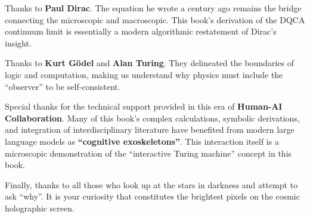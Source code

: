Thanks to \textbf{Paul Dirac}. The equation he wrote a century ago remains the bridge connecting the microscopic and macroscopic. This book's derivation of the DQCA continuum limit is essentially a modern algorithmic restatement of Dirac's insight.

Thanks to \textbf{Kurt G\"{o}del} and \textbf{Alan Turing}. They delineated the boundaries of logic and computation, making us understand why physics must include the ``observer'' to be self-consistent.

Special thanks for the technical support provided in this era of \textbf{Human-AI Collaboration}. Many of this book's complex calculations, symbolic derivations, and integration of interdisciplinary literature have benefited from modern large language models as \textbf{``cognitive exoskeletons''}. This interaction itself is a microscopic demonstration of the ``interactive Turing machine'' concept in this book.

Finally, thanks to all those who look up at the stars in darkness and attempt to ask ``why''. It is your curiosity that constitutes the brightest pixels on the cosmic holographic screen.
